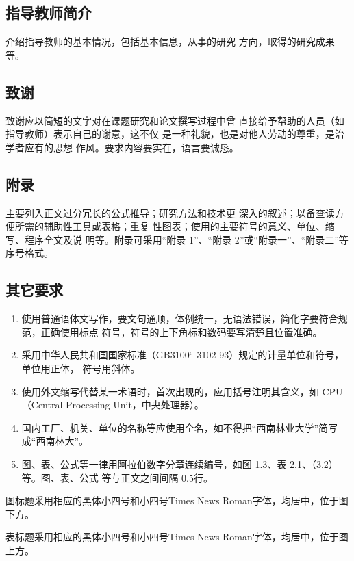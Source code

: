 \documentclass{swfuthesis}
\begin{document}
\subsection{指导教师简介}

介绍指导教师的基本情况，包括基本信息，从事的研究
方向，取得的研究成果等。

\subsection{致谢}

致谢应以简短的文字对在课题研究和论文撰写过程中曾
直接给予帮助的人员（如指导教师）表示自己的谢意，这不仅
是一种礼貌，也是对他人劳动的尊重，是治学者应有的思想
作风。要求内容要实在，语言要诚恳。

\subsection{附录}

主要列入正文过分冗长的公式推导；研究方法和技术更
深入的叙述；以备查读方便所需的辅助性工具或表格；重复
性图表；使用的主要符号的意义、单位、缩写、程序全文及说
明等。附录可采用“附录 1”、“附录 2”或“附录一”、“附录二”等
序号格式。

\subsection{其它要求}

\begin{enumerate}
\item 使用普通语体文写作，要文句通顺，体例统一，无语法错误，简化字要符合规范，正确使用标点
  符号，符号的上下角标和数码要写清楚且位置准确。
\item 采用中华人民共和国国家标准（GB3100\char`~3102-93）规定的计量单位和符号，单位用正体，
  符号用斜体。
\item 使用外文缩写代替某一术语时，首次出现的，应用括号注明其含义，如 CPU（Central
  Processing Unit，中央处理器）。
\item 国内工厂、机关、单位的名称等应使用全名，如不得把“西南林业大学”简写成“西南林大”。
\item 图、表、公式等一律用阿拉伯数字分章连续编号，如图 1.3、表 2.1、（3.2）等。图、表、公式
  等与正文之间间隔 0.5行。
\end{enumerate}

图标题采用相应的黑体小四号和小四号Times News Roman字体，均居中，位于图下方。

表标题采用相应的黑体小四号和小四号Times News Roman字体，均居中，位于图上方。
\end{document}
